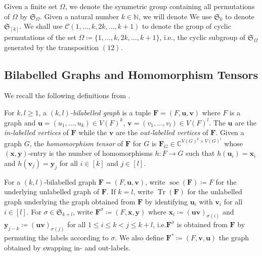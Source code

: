 \documentclass[a4paper,onecolumn,11pt,accepted=2026-01-06]{quantumarticle}
\theoremstyle{plain}
\theoremstyle{remark}
\theoremstyle{definition}
\DeclareMathOperator{\tr}{Tr}
\DeclareMathOperator{\soe}{soe}
\newcommand{\cyclicpermutations}{\mathscr{C}(1,\dots, k, 2k, \dots, k+1)}
\begin{document}
Given a finite set $\Omega$, we denote the symmetric group containing all permutations of $\Omega$ by $\mathfrak{S}_{\Omega}$. Given a natural number $k \in \mathbb{N}$, we will denote We use $\mathfrak{S}_{k}$ to denote $\mathfrak{S}_{[k]}$. We shall use $\cyclicpermutations$ to denote the group of cyclic permutations of the set $\Omega \coloneq \{1,\dots,k, 2k, \dots, k+1\}$, i.e., the cyclic subgroup of $\mathfrak{S}_{\Omega}$ generated by the transposition $(12)$. 

\subsection{Bilabelled Graphs and Homomorphism Tensors}\label{sec:hom-ten}

We recall the following definitions from \cite{david-laura,grohe_homomorphism_2022}.
    
For $k, l \geq 1$, a \emph{$(k, l)$-bilabelled graph} is a tuple $\boldsymbol{F} = (F, \boldsymbol{u}, \boldsymbol{v})$ where $F$ is a graph and $\boldsymbol{u} = (u_1, \dots , u_k) \in V(F)^k$, $\boldsymbol{v} = (v_1, \dots, v_l) \in V(F)^l$.
The $\boldsymbol{u}$ are the \emph{in-labelled vertices} of $\boldsymbol{F}$ while the $\boldsymbol{v}$ are the \emph{out-labelled vertices} of $\boldsymbol{F}$. Given a graph $G$, the \emph{homomorphism tensor} of $\boldsymbol{F}$ for $G$ is $\boldsymbol{F}_G \in \mathbb{C}^{V(G)^k \times V(G)^l}$ whose $(\boldsymbol{x}, \boldsymbol{y})$-entry %
is the number of homomorphisms $h \colon F \to G$ such that $h(\boldsymbol{u}_i) = \boldsymbol{x}_i$ and $h(\boldsymbol{v}_j) = \boldsymbol{y}_j$ for all $i \in [k]$ and $j \in [l]$. %

For a $(k, l)$-bilabelled graph $\boldsymbol{F} = (F, \boldsymbol{u}, \boldsymbol{v})$, write $\soe(\boldsymbol{F}) \coloneqq F$ for the underlying unlabelled graph of $\boldsymbol{F}$. 
If $k = l$, write $\tr(\boldsymbol{F})$ for the unlabelled graph underlying the graph obtained from $\boldsymbol{F}$ by identifying $\boldsymbol{u}_i$ with $\boldsymbol{v}_i$ for all $i\in [l]$.
For $\sigma \in \mathfrak{S}_{k+l}$, write $\boldsymbol{F}^\sigma \coloneqq (F, \boldsymbol{x}, \boldsymbol{y})$ where $\boldsymbol{x}_i \coloneqq (\boldsymbol{uv})_{\sigma(i)}$ and  $\boldsymbol{y}_{j-k} \coloneqq (\boldsymbol{uv})_{\sigma(j)}$ for all $1 \leq i \leq k < j \leq k+l$, i.e.\@ $\boldsymbol{F}^\sigma$ is obtained from $\boldsymbol{F}$ by permuting the labels according to $\sigma$.
We also define $\boldsymbol{F}^* \coloneqq (F, \boldsymbol{v}, \boldsymbol{u})$ the graph obtained by swapping in- and out-labels. %
    
\end{document}
